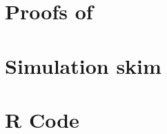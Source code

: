 \documentclass[a4paper,11pt]{book}
\begin{document}
\chapter{Proofs of }\label{PRO_FREQ_CIRCDECONV_UNKNOWN_IID_ORACLE_NP}

\chapter{Simulation skim}\label{SIMULATION}
%
\chapter{R Code}\label{CODE}
%
%

{}
\nocite{*}

%
\end{document}
